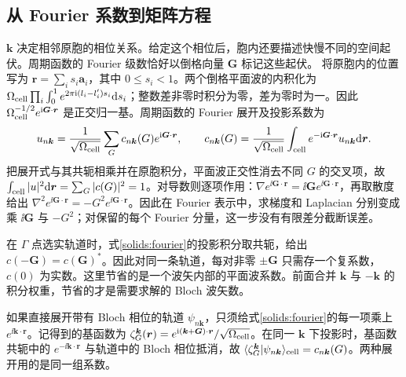 \subsection{从 Fourier 系数到矩阵方程}
$\bm k$ 决定相邻原胞的相位关系。给定这个相位后，胞内还要描述快慢不同的空间起伏。周期函数的 Fourier 级数恰好以倒格向量 $\bm G$ 标记这些起伏。
将原胞内的位置写为 $\bm r=\sum_i s_i\bm a_i$，其中 $0\le s_i<1$。两个倒格平面波的内积化为 $\Omega_{\rm cell}\prod_i\int_0^1e^{2\pi\mathrm{i}(l_i-l_i')s_i}\mathrm{d} s_i$；整数差非零时积分为零，差为零时为一。因此 $\Omega_{\rm cell}^{-1/2}e^{\mathrm{i}\bm G\cdot\bm r}$ 是正交归一基。周期函数的 Fourier 展开及投影系数为
\begin{equation}\label{solids:fourier}
u_{n\bm k}=\frac1{\sqrt{\Omega_{\rm cell}}}\sum_Gc_{n\bm k}(G)e^{\mathrm{i}\bm G\cdot\bm r},\qquad
c_{n\bm k}(G)=\frac1{\sqrt{\Omega_{\rm cell}}}\int_{\rm cell}e^{-\mathrm{i}\bm G\cdot\bm r}u_{n\bm k}\mathrm{d}\bm r.
\end{equation}
把展开式与其共轭相乘并在原胞积分，平面波正交性消去不同 $G$ 的交叉项，故 $\int_{\rm cell}|u|^2\mathrm{d}\bm r=\sum_G|c(G)|^2=1$。对导数则逐项作用：$\nabla e^{\ii\bm G\cdot\bm r}=\ii\bm G e^{\ii\bm G\cdot\bm r}$，再取散度给出 $\nabla^2e^{\ii\bm G\cdot\bm r}=-G^2e^{\ii\bm G\cdot\bm r}$。因此在 Fourier 表示中，求梯度和 Laplacian 分别变成乘 $\ii\bm G$ 与 $-G^2$；对保留的每个 Fourier 分量，这一步没有有限差分截断误差。

在 $\Gamma$ 点选实轨道时，式\eqref{solids:fourier}的投影积分取共轭，给出 $c(-\bm G)=c(\bm G)^*$。因此对同一条轨道，每对非零 $\pm\bm G$ 只需存一个复系数，$c(0)$ 为实数。这里节省的是一个波矢内部的平面波系数。前面合并 $\bm k$ 与 $-\bm k$ 的积分权重，节省的才是需要求解的 Bloch 波矢数。

如果直接展开带有 Bloch 相位的轨道 $\psi_{n\bm k}$，只须给式\eqref{solids:fourier}的每一项乘上 $e^{\ii\bm k\cdot\bm r}$。记得到的基函数为 $\zeta^{\bm k}_{G}(\bm r)=e^{\mathrm{i}(\bm k+\bm G)\cdot\bm r}/\sqrt{\Omega_{\rm cell}}$。在同一 $\bm k$ 下投影时，基函数共轭中的 $e^{-\ii\bm k\cdot\bm r}$ 与轨道中的 Bloch 相位抵消，故 $\langle\zeta^{\bm k}_{G}|\psi_{n\bm k}\rangle_{\rm cell}=c_{n\bm k}(G)$。两种展开用的是同一组系数。


